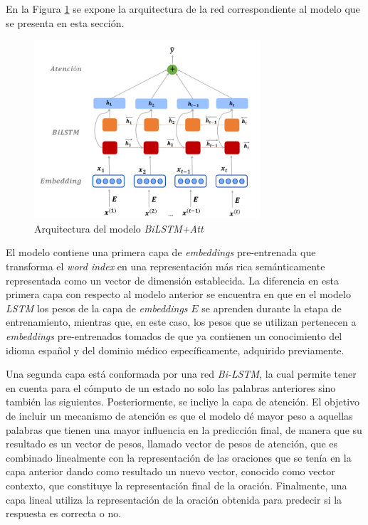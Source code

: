 En la Figura \ref{bilstm} se expone la arquitectura de la red correspondiente al modelo que se presenta en esta sección. 

\begin{figure}[!tb]
  \begin{center}
    \includegraphics[angle=0, width=0.75\textwidth]{Graphics/bilstm.png}
  \end{center}
    \caption{Arquitectura del modelo \textit{BiLSTM+Att}}\label{bilstm}
\end{figure}

El modelo contiene una primera capa de \textit{embeddings} pre-entrenada que transforma el \textit{word index} en una representación más rica semánticamente representada como un vector de dimensión establecida. La diferencia en esta primera capa con respecto al modelo anterior se  encuentra en que en el modelo \textit{LSTM} los pesos de la capa de \textit{embeddings} $E$ se aprenden durante la etapa de entrenamiento, mientras que, en este caso, los pesos que se utilizan pertenecen a \textit {embeddings} pre-entrenados tomados de \cite{2019-medical-fastext} que ya contienen un conocimiento del idioma español y del dominio médico específicamente, adquirido previamente.

Una segunda capa está conformada por una red \textit{Bi-LSTM}, la cual permite tener en cuenta para el cómputo de un estado no solo las palabras anteriores sino también las siguientes. Posteriormente, se incliye la capa de atención. El objetivo de incluir un mecanismo de atención es que el modelo dé mayor peso a aquellas palabras que tienen una mayor influencia en la predicción final, de manera que su resultado es un vector de pesos, llamado vector de pesos de atención, que es combinado linealmente con la representación de las oraciones que se tenía en la capa anterior dando como resultado un nuevo vector, conocido como vector contexto, que constituye la representación final de la oración. Finalmente, una capa lineal utiliza la representación de la oración obtenida para predecir si la respuesta es correcta o no.

